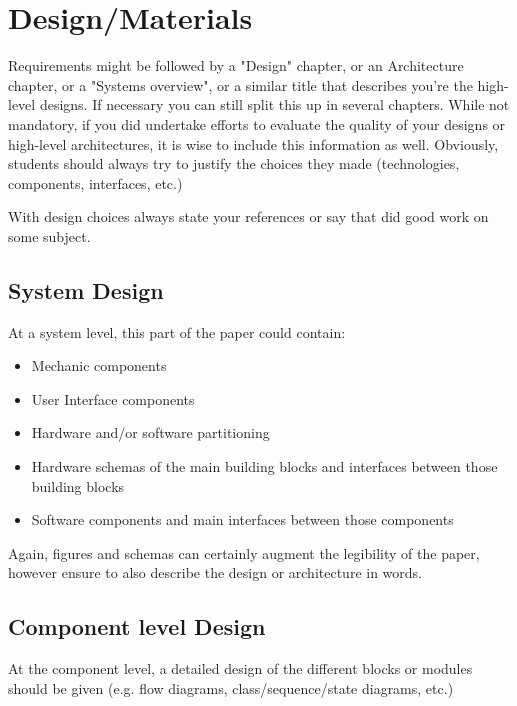 \chapter{Design/Materials}

Requirements might be followed by a "Design" chapter, or an Architecture chapter, or a "Systems overview", or a similar title that describes you're the high-level designs. If necessary you can still split this up in several chapters. While not mandatory, if you did undertake efforts to evaluate the quality of your designs or high-level architectures, it is wise to include this information as well. Obviously, students should always try to justify the choices they made (technologies, components, interfaces, etc.)\par

With design choices always state your references \citep{Castleman98,Granlund95} or say that \citet{Holmes95} did good work on some subject.

\section{System Design}
At a system level, this part of the paper could contain:
\begin{itemize}
\item Mechanic components
\item User Interface components
\item Hardware and/or software partitioning
\item Hardware schemas of the main building blocks and interfaces between those building blocks
\item Software components and main interfaces between those components
\end{itemize}

Again, figures and schemas can certainly augment the legibility of the paper, however ensure to also describe the design or architecture in words.\par

\section{Component level Design}
At the component level, a detailed design of the different blocks or modules should be given (e.g. flow diagrams, class/sequence/state diagrams, etc.)\par

